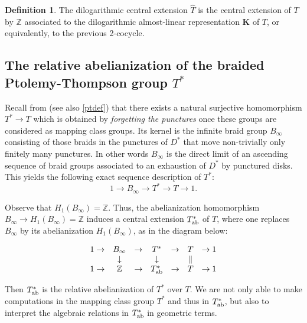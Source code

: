 \documentclass[twoside]{irmaems}
\theoremstyle{plain}
\theoremstyle{definition}
\newtheorem{definition}{Definition}[section]
\theoremstyle{remark}
\newcommand{\Z}{{\mathbb{Z}}}
\newcommand{\T}{T^{*}}
\begin{document}
\begin{definition}
The dilogarithmic central extension 
$\widehat{T}$ is the central extension of $T$ by $\Z$  
associated to the dilogarithmic almost-linear representation $\mathbf K$ 
of $T$, or equivalently, to the previous 2-cocycle. 
\end{definition}




 

\subsection{The relative abelianization of the 
braided Ptolemy-Thompson group $T^*$}
Recall from \cite{fu-ka2,fu-ka4} (see also \ref{ptdef}) that there 
exists a natural surjective homomorphism $T^*\to T$  
which is obtained by {\em forgetting the punctures} once 
these groups are considered as mapping class groups.  
Its kernel is the infinite braid group $B_{\infty}$ 
consisting of those braids in the punctures 
of $D^*$ that move non-trivially only finitely many punctures. 
In other words $B_{\infty}$ is the direct limit of an ascending 
sequence of braid groups associated to an exhaustion of $D^*$ by punctured 
disks.  This yields the  following exact sequence description of $T^*$:
\[ 1 \to B_{\infty} \to \T\to T \to 1. \]

\vspace{0.2cm}
\noindent 
Observe that $H_1(B_{\infty})=\Z$. Thus, the abelianization homomorphism  
$B_{\infty}\to H_1(B_{\infty})=\Z$  
induces a central extension $T^*_{\rm ab}$ of $T$, where one 
replaces $B_{\infty}$ by its abelianization 
$H_1(B_{\infty})$, as in the diagram below: 

\[ \begin{array}{ccccccc}
1  \to & B_{\infty} & \to & \T         & \to &  T        & \to 1 \\
       & \downarrow &     & \downarrow &     & \parallel &   \\ 
1  \to & \Z         & \to & T^*_{\rm ab}          & \to &   T       & \to 1  
\end{array}
\]

\vspace{0.2cm}
\noindent Then $T^*_{\rm ab}$ is the relative abelianization of $T^*$ over $T$. 
We are not only able to make computations in the 
mapping class group $T^*$ and thus in $T^*_{\rm ab}$,  but also 
to interpret the algebraic relations in $T^*_{\rm ab}$ in geometric terms. 
 
\end{document}
